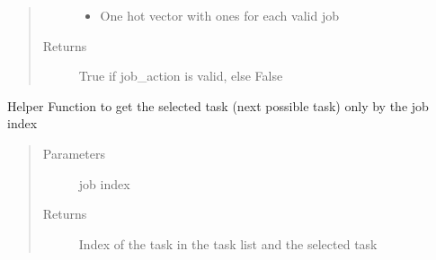 \documentclass[letterpaper,10pt,english]{sphinxmanual}
\begin{document}
\begin{fulllineitems}
\begin{fulllineitems}
\begin{quote}
\begin{description}
\begin{itemize}
\item {} 
\sphinxAtStartPar
{} \textendash{} One hot vector with ones for each valid job

\end{itemize}

\item[{Returns}] \leavevmode
\sphinxAtStartPar
True if job\_action is valid, else False

\end{description}\end{quote}

\end{fulllineitems}


\begin{fulllineitems}
\label{\detokenize{environments:environments.env_tetris_scheduling.Env.get_selected_task}}
\sphinxAtStartPar
Helper Function to get the selected task (next possible task) only by the job index
\begin{quote}\begin{description}
\item[{Parameters}] \leavevmode
\sphinxAtStartPar
{} \textendash{} job index

\item[{Returns}] \leavevmode
\sphinxAtStartPar
Index of the task in the task list and the selected task

\end{description}\end{quote}

\end{fulllineitems}



\end{fulllineitems}
\end{document}

